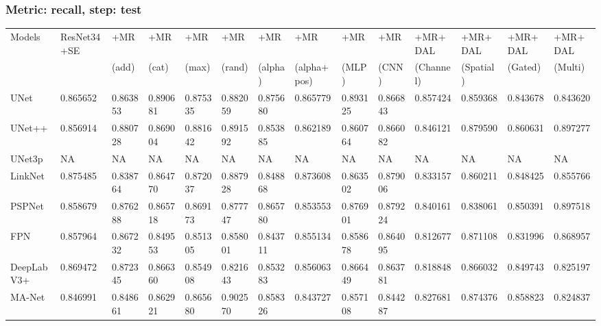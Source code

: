 \documentclass{article}
\begin{document}
\subsubsection{Metric: recall, step: test}
\begin{tabular}{llllllllllllll}
\toprule
Models & ResNet34+SE & +MR  & +MR  & +MR  & +MR  & +MR  & +MR  & +MR  & +MR  & +MR+DAL & +MR+DAL & +MR+DAL & +MR+DAL \\
       &             &  (add) &  (cat) &  (max) &  (rand) &  (alpha) &  (alpha+pos) &  (MLP) &  (CNN) & (Channel) & (Spatial) & (Gated) & (Multi) \\
\midrule
UNet & 0.865652 & 0.863853 & 0.890681 & 0.875335 & 0.882059 & 0.875680 & 0.865779 & 0.893125 & 0.866843 & 0.857424 & 0.859368 & 0.843678 & 0.843620 \\
UNet++ & 0.856914 & 0.880728 & 0.869004 & 0.881642 & 0.891592 & 0.853885 & 0.862189 & 0.860764 & 0.866082 & 0.846121 & 0.879590 & 0.860631 & 0.897277 \\
UNet3p & NA & NA & NA & NA & NA & NA & NA & NA & NA & NA & NA & NA & NA \\
LinkNet & 0.875485 & 0.838764 & 0.864770 & 0.872037 & 0.887928 & 0.848868 & 0.873608 & 0.863502 & 0.879006 & 0.833157 & 0.860211 & 0.848425 & 0.855766 \\
PSPNet & 0.858679 & 0.876288 & 0.865718 & 0.869173 & 0.877747 & 0.865780 & 0.853553 & 0.876901 & 0.879224 & 0.840161 & 0.838061 & 0.850391 & 0.897518 \\
FPN & 0.857964 & 0.867232 & 0.849553 & 0.851305 & 0.858001 & 0.843711 & 0.855134 & 0.858678 & 0.864095 & 0.812677 & 0.871108 & 0.831996 & 0.868957 \\
DeepLabV3+ & 0.869472 & 0.872345 & 0.866360 & 0.854908 & 0.821643 & 0.853283 & 0.856063 & 0.866449 & 0.863781 & 0.818848 & 0.866032 & 0.849743 & 0.825197 \\
MA-Net & 0.846991 & 0.848661 & 0.862921 & 0.865680 & 0.902570 & 0.858326 & 0.843727 & 0.857108 & 0.844287 & 0.827681 & 0.874376 & 0.858823 & 0.824837 \\
\bottomrule
\end{tabular}
\end{document}
